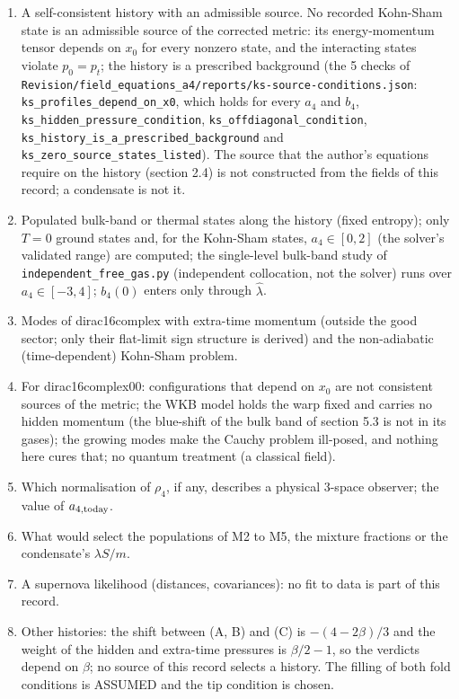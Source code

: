 \documentclass[11pt]{article}
\begin{document}
\begin{enumerate}
\item A self-consistent history with an admissible source. No recorded Kohn-Sham state is an admissible source of the corrected metric: its energy-momentum tensor depends on $x_0$ for every nonzero state, and the interacting states violate $p_0 = p_t$; the history is a prescribed background (the 5 checks of \texttt{Revision\allowbreak{}/field\_e\allowbreak{}quations\allowbreak{}\_a4/repo\allowbreak{}rts/ks-s\allowbreak{}ource-co\allowbreak{}nditions\allowbreak{}.json}: \texttt{ks\_profi\allowbreak{}les\_depe\allowbreak{}nd\_on\_x0}, which holds for every $a_4$ and $b_4$, \texttt{ks\_hidde\allowbreak{}n\_pressu\allowbreak{}re\_condi\allowbreak{}tion}, \texttt{ks\_offdi\allowbreak{}agonal\_c\allowbreak{}ondition}, \texttt{ks\_histo\allowbreak{}ry\_is\_a\_\allowbreak{}prescrib\allowbreak{}ed\_backg\allowbreak{}round} and \texttt{ks\_zero\_\allowbreak{}source\_s\allowbreak{}tates\_li\allowbreak{}sted}). The source that the author's equations require on the history (section 2.4) is not constructed from the fields of this record; a condensate is not it.
\item Populated bulk-band or thermal states along the history (fixed entropy); only $T = 0$ ground states and, for the Kohn-Sham states, $a_4 \in [0, 2]$ (the solver's validated range) are computed; the single-level bulk-band study of \texttt{independ\allowbreak{}ent\_free\allowbreak{}\_gas.py} (independent collocation, not the solver) runs over $a_4 \in [-3, 4]$; $b_4(0)$ enters only through $\hat\lambda$.
\item Modes of dirac16complex with extra-time momentum (outside the good sector; only their flat-limit sign structure is derived) and the non-adiabatic (time-dependent) Kohn-Sham problem.
\item For dirac16complex00: configurations that depend on $x_0$ are not consistent sources of the metric; the WKB model holds the warp fixed and carries no hidden momentum (the blue-shift of the bulk band of section 5.3 is not in its gases); the growing modes make the Cauchy problem ill-posed, and nothing here cures that; no quantum treatment (a classical field).
\item Which normalisation of $\rho_4$, if any, describes a physical 3-space observer; the value of $a_{4,\rm today}$.
\item What would select the populations of M2 to M5, the mixture fractions or the condensate's $\lambda S/m$.
\item A supernova likelihood (distances, covariances): no fit to data is part of this record.
\item Other histories: the shift between (A, B) and (C) is $-(4 - 2\beta)/3$ and the weight of the hidden and extra-time pressures is $\beta/2 - 1$, so the verdicts depend on $\beta$; no source of this record selects a history. The filling of both fold conditions is ASSUMED and the tip condition is chosen.
\end{enumerate}
\end{document}
